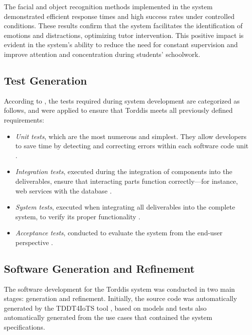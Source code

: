                 The facial and object recognition methods implemented in the system demonstrated efficient response times and high success rates under controlled conditions. These results confirm that the system facilitates the identification of emotions and distractions, optimizing tutor intervention. This positive impact is evident in the system’s ability to reduce the need for constant supervision and improve attention and concentration during students’ schoolwork.
                
                \subsection{Test Generation}
                According to \cite{Sciarra2024Smash}, the tests required during system development are categorized as follows, and were applied to ensure that Torddis meets all previously defined requirements:
                
                \begin{itemize}
                    \item \textit{Unit tests}, which are the most numerous and simplest. They allow developers to save time by detecting and correcting errors within each software code unit \citep{Mafi2024Regression}.
                    
                    \item \textit{Integration tests}, executed during the integration of components into the deliverables, ensure that interacting parts function correctly—for instance, web services with the database \citep{Spath2025Spring}.
                    
                    \item \textit{System tests}, executed when integrating all deliverables into the complete system, to verify its proper functionality \citep{Smytzek2024Tests4Py, Wang2024Ctest4J}.
                    
                    \item \textit{Acceptance tests}, conducted to evaluate the system from the end-user perspective \citep{Augusto2025Software}.
                \end{itemize}
                
                \subsection{Software Generation and Refinement}
                The software development for the Torddis system was conducted in two main stages: generation and refinement. Initially, the source code was automatically generated by the TDDT4IoTS tool \citep{Guerrero2024Test}, based on models and tests also automatically generated from the use cases that contained the system specifications.
                
